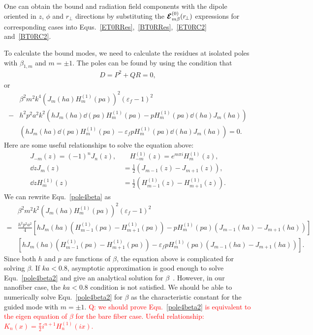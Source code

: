 One can obtain the bound and radiation field components with the dipole oriented in $ z $, $ \phi $ and $ r\!_\perp $ directions by substituting the $ \boldsymbol{\mathcal{E}}^{(0)}_{m\beta}(r\!_\perp) $ expressions for corresponding cases into Equs.~\ref{ET0RRes},~\ref{BT0RRes},~\ref{ET0RC2} and~\ref{BT0RC2}. 

To calculate the bound modes, we need to calculate the residues at isolated poles with $ \beta_{1,m} $ and $ m=\pm 1 $. The poles can be found by using the condition that
\begin{align}
D=P^2+QR=0,
\end{align}
or
\begin{align}\label{pole4beta}
&\beta^2m^2k^4\left(J_m(ha) H_m^{(1)}(pa) \right)^2 (\varepsilon_f-1)^2\nonumber\\
-& h^2p^2a^2k^2 \left(hJ_m(ha) \dd{}{(pa)}H_m^{(1)}(pa)-pH_m^{(1)}(pa)\dd{}{(ha)}J_m(ha) \right)\nonumber\\ &\left(hJ_m(ha) \dd{}{(pa)}H_m^{(1)}(pa)-\varepsilon_f pH_m^{(1)}(pa)\dd{}{(ha)}J_m(ha) \right)=0.
\end{align}
Here are some useful relationships to solve the equation above:
\begin{align}
J_{-m}(z)=(-1)^nJ_n(z),\, &\quad H_{-m}^{(1)}(z)=e^{m\pi i}H_m^{(1)}(z),\\
\dd{}{z}J_m(z) &= \frac{1}{2} \left( J_{m-1}(z)-J_{m+1}(z) \right),\\ 
\dd{}{z}H^{(1)}_m(z) &= \frac{1}{2} \left( H^{(1)}_{m-1}(z)-H^{(1)}_{m+1}(z) \right).
\end{align}
We can rewrite Equ.~\ref{pole4beta} as
\begin{align}\label{pole4beta2}
&\beta^2m^2k^2\left(J_m\!(ha) H_m^{(\!1\!)}\!(pa) \right)^2 (\varepsilon_f-1)^2\nonumber\\
=& \frac{h^2p^2a^2}{4} \left[hJ_m\!(ha)\! \left( H^{(\!1\!)}_{m-1}\!(pa)\!-\! H^{(\!1\!)}_{m+1}\!(pa) \right)\!-\! pH_m^{(\!1\!)}\!(pa)\left( J_{m-1}\!(ha)\!-\! J_{m+1}\!(ha) \right) \right]\nonumber\\ 
&\left[hJ_m\!(ha) \left( H^{(\!1\!)}_{m-1}\!(pa)\!-\! H^{(\!1\!)}_{m+1}\!(pa) \right)\!-\! \varepsilon_f pH_m^{(\!1\!)}\!(pa)\left( J_{m-1}\!(ha)\!-\! J_{m+1}\!(ha) \right) \right].
\end{align}
Since both $ h $ and $ p $ are functions of $ \beta $, the equation above is complicated for solving $ \beta $. If $ ka<0.8 $, asymptotic approximation is good enough to solve Equ.~\ref{pole4beta2} and give an analytical solution for $ \beta $~\cite{Klimov2004}. However, in our nanofiber case, the $ ka<0.8 $ condition is not satisfied. We should be able to numerically solve Equ.~\ref{pole4beta2} for $ \beta $ as the characteristic constant for the guided mode with $ m=\pm 1 $. \textcolor{red}{Q: we should prove Equ.~\eqref{pole4beta2} is equivalent to the eigen equation of $ \beta $ for the bare fiber case. Useful relationship: $ K_n(x)=\frac{\pi}{2}i^{n+1}H_n^{(1)}(ix) $.}

